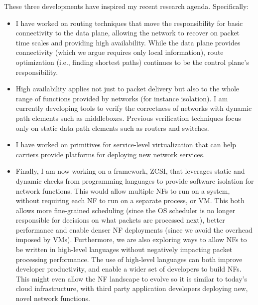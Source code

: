 \documentclass[letterpaper]{article}
\newcommand\eat[1]{}
\begin{document}
\eat{Secondly, customers (both end user and content providers) expect networks to be highly available: in particular
requiring little or no disruption during failures. Providing high availability means that networks can no longer wait
for control plane convergence (at least not for tens or hundreds of milliseconds) to restore connectivity (i.e. ensure
that there are paths from a source to a destination). Furthermore, any misconfiguration of middleboxes or switches can
be catastrophic, requiring that customers wait not just for control plane convergence but for human intervention. Modern
networks therefore need to protect against a wide variety of failure scenarios, including not just equipment failure but
also misconfiguration.}

These three developments have inspired my recent research agenda. Specifically:
\begin{itemize}
    \item I have worked on routing techniques that move the responsibility for basic connectivity to the data plane,
        allowing the network to recover on packet time scales and providing high availability. While the data plane
        provides connectivity (which we argue requires only local information), route optimization (i.e., finding shortest paths) continues to be the
        control plane's responsibility.
    \item High availability applies not just to packet delivery but also to the whole range of functions provided by
        networks (for instance isolation). I am currently developing tools to verify the correctness of networks with
        dynamic path elements such as middleboxes. Previous verification techniques focus only on static data path
        elements such as routers and switches.
    \item I have worked on primitives for service-level virtualization that can help carriers provide platforms
        for deploying new network services. 
    \item Finally, I am now working on a framework, ZCSI, that leverages static and dynamic checks from programming languages
    to provide software isolation for network functions. This would allow multiple NFs to run on a system, without
    requiring each NF to run on a separate process, or VM. This both allows more fine-grained scheduling (since the OS
    scheduler is no longer responsible for decisions on what packets are processed next), better performance and enable
    denser NF deployments (since we avoid the overhead imposed by VMs). Furthermore, we are also exploring ways to allow
    NFs to be written in high-level languages without negatively impacting packet processing performance. The use of
    high-level languages can both improve developer productivity, and enable a wider set of developers to build NFs.
    This might even allow the NF landscape to evolve so it is similar to today's cloud infrastructure, with third party
    application developers deploying new, novel network functions.
\end{itemize}
\end{document}
